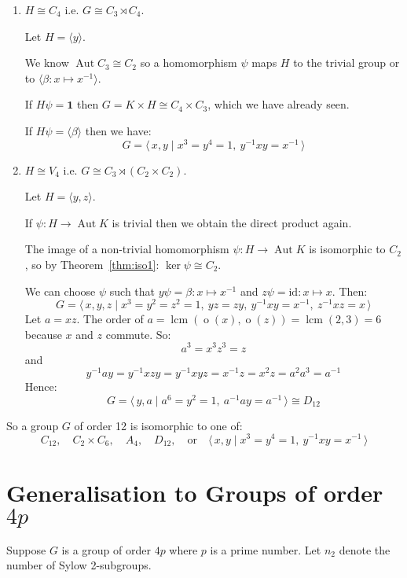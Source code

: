 \documentclass[a4paper, oneside, 12pt, final]{article}
\theoremstyle{definition}
\DeclareMathOperator{\Aut}{Aut}
\DeclareMathOperator{\order}{o}
\DeclareMathOperator{\lcm}{lcm}
\begin{document}
\begin{enumerate}
    \item \(H \cong C_4\) i.e. \(G \cong C_3 \rtimes C_4\).

        Let \(H = \langle y \rangle\).

        We know \(\Aut{C_3} \cong C_2\) so a homomorphism \(\psi\) maps \(H\) to the trivial group or to \(\langle
        \beta:x \mapsto x^{-1} \rangle\).

        If \(H\psi = \bm{1}\) then \(G = K \times H \cong C_4 \times C_3\), which we have already seen.

        If \(H\psi = \langle \beta \rangle\) then we have:
        \[G = \langle\, x, y \mid x^3 = y^4 = 1,\ y^{-1}xy = x^{-1}\,\rangle\]

    \item \(H \cong V_4\) i.e. \(G \cong C_3 \rtimes (C_2 \times C_2)\).

        Let \(H = \langle y, z \rangle\).

        If \(\psi:H \to \Aut{K}\) is trivial then we obtain the direct product again.

        The image of a non-trivial homomorphism \(\psi:H \to \Aut{K}\) is isomorphic to \(C_2\), so by
        Theorem~\ref{thm:iso1}: \(\ker{\psi} \cong C_2\).

        We can choose \(\psi\) such that \(y\psi = \beta:x \mapsto x^{-1}\) and \(z\psi = \text{id}:x \mapsto x\).
        Then:
        \[G = \langle\, x, y, z \mid x^3 = y^2 = z^2 = 1,\ yz = zy,\ y^{-1}xy = x^{-1},\ z^{-1}xz = x\,\rangle\]
        Let \(a = xz\).
        The order of \(a = \lcm{(\order{(x)}, \order{(z)})} = \lcm{(2, 3)} = 6\) because \(x\) and \(z\) commute.
        So:
        \[a^3 = x^3z^3 = z\]
        and
        \[ y^{-1}ay = y^{-1}xzy = y^{-1}xyz = x^{-1}z = x^2z = a^2a^3 = a^{-1}\]
        Hence:
        \[G = \langle\, y, a \mid a^6 = y^2 = 1,\ a^{-1}ay = a^{-1}\,\rangle
        \cong D_{12}\]
\end{enumerate}

So a group \(G\) of order 12 is isomorphic to one of:
\[
    C_{12}, \quad%
    C_2 \times C_6, \quad%
    A_4, \quad%
    D_{12}, \quad \text{or} \quad%
    \langle\, x, y \mid x^3 = y^4 = 1,\ y^{-1}xy = x^{-1}\,\rangle
\]

\section{Generalisation to Groups of order \(4p\)}
Suppose \(G\) is a group of order \(4p\) where \(p\) is a prime number.
Let \(n_2\) denote the number of Sylow 2-subgroups.
\end{document}
